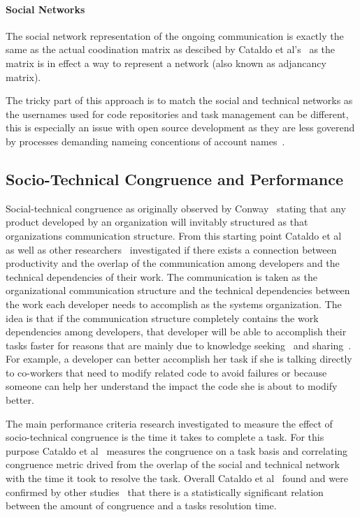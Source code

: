\paragraph{Social Networks}
The social network representation of the ongoing communication is exactly the same as the actual coodination matrix as descibed by Cataldo et al's~\cite{} as the matrix is in effect a way to represent a network (also known as adjancancy matrix).

The tricky part of this approach is to match the social and technical networks as the usernames used for code repositories and task management can be different, this is especially an issue with open source development as they are less goverend by processes demanding nameing concentions of account names~\cite{}.

\subsection{Socio-Technical Congruence and Performance}
Social-technical congruence as originally observed by Conway~\cite{} stating that any product developed by an organization will invitably structured as that organizations communication structure.
From this starting point Cataldo et al~\cite{} as well as other researchers~\cite{} investigated if there exists a connection between productivity and the overlap of the communication among developers and the technical dependencies of their work.
The communication is taken as the organizational communication structure and the technical dependencies between the work each developer needs to accomplish as the systems organization.
The idea is that if the communication structure completely contains the work dependencies among developers, that developer will be able to accomplish their tasks faster for reasons that are mainly due to knowledge seeking~\cite{} and sharing~\cite{}.
For example, a developer can better accomplish her task if she is talking directly to co-workers that need to modify related code to avoid failures or because someone can help her understand the impact the code she is about to modify better.

The main performance criteria research investigated to measure the effect of socio-technical congruence is the time it takes to complete a task.
For this purpose Cataldo et al~\cite{} measures the congruence on a task basis and correlating congruence metric drived from the overlap of the social and technical network with the time it took to resolve the task.
Overall Cataldo et al~\cite{} found and were confirmed by other studies~\cite{} that there is a statistically significant relation between the amount of congruence and a tasks resolution time.

